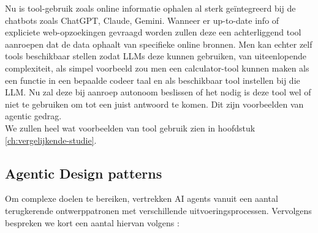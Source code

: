 Nu is tool-gebruik zoals online informatie ophalen al sterk geïntegreerd bij de chatbots zoals ChatGPT, Claude, Gemini. Wanneer er up-to-date info of expliciete web-opzoekingen gevraagd worden zullen deze een achterliggend tool aanroepen dat de data ophaalt van specifieke online bronnen. Men kan echter zelf tools beschikbaar stellen zodat LLMs deze kunnen gebruiken, van uiteenlopende complexiteit, als simpel voorbeeld zou men een calculator-tool kunnen maken als een functie in een bepaalde codeer taal en als beschikbaar tool instellen bij die LLM. Nu zal deze bij aanroep autonoom beslissen of het nodig is deze tool wel of niet te gebruiken om tot een juist antwoord te komen. Dit zijn voorbeelden van agentic gedrag. \\

We zullen heel wat voorbeelden van tool gebruik zien in hoofdstuk \ref{ch:vergelijkende-studie}. 


\subsection{Agentic Design patterns}
\label{ssec:agenticdesignpatterns}
Om complexe doelen te bereiken, vertrekken AI agents vanuit een aantal terugkerende ontwerppatronen met verschillende uitvoeringsprocessen. Vervolgens bespreken we kort een aantal hiervan volgens \autocite{Dilmegani2025}:

